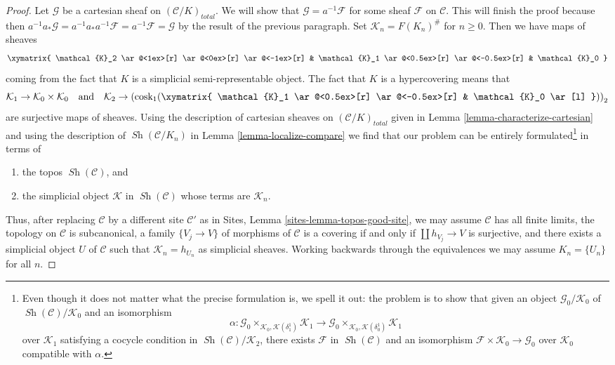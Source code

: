 \documentclass[10pt,a4paper]{amsart}
\theoremstyle{plain}
\theoremstyle{definition}
\theoremstyle{remark}
\numberwithin{equation}{subsection}
\def\Sh{\mathop{\mathit{Sh}}\nolimits}
\begin{document}
\begin{proof}
\medskip\noindent
Let $\mathcal{G}$ be a cartesian sheaf on $(\mathcal{C}/K)_{total}$.
We will show that $\mathcal{G} = a^{-1}\mathcal{F}$ for some sheaf
$\mathcal{F}$ on $\mathcal{C}$. This will finish the proof because
then $a^{-1}a_*\mathcal{G} = a^{-1}a_*a^{-1}\mathcal{F} =
a^{-1}\mathcal{F} = \mathcal{G}$ by the result of the previous paragraph.
Set $\mathcal{K}_n = F(K_n)^\#$ for $n \geq 0$. Then we have maps of sheaves
$$
\xymatrix{
\mathcal{K}_2
\ar@<1ex>[r]
\ar@<0ex>[r]
\ar@<-1ex>[r]
&
\mathcal{K}_1
\ar@<0.5ex>[r]
\ar@<-0.5ex>[r]
&
\mathcal{K}_0
}
$$
coming from the fact that $K$ is a simplicial semi-representable object.
The fact that $K$ is a hypercovering means that
$$
\mathcal{K}_1 \to \mathcal{K}_0 \times \mathcal{K}_0
\quad\text{and}\quad
\mathcal{K}_2 \to
\left(\text{cosk}_1(
\xymatrix{
\mathcal{K}_1
\ar@<0.5ex>[r]
\ar@<-0.5ex>[r]
&
\mathcal{K}_0 \ar[l]
})\right)_2
$$
are surjective maps of sheaves. Using the description of cartesian sheaves on
$(\mathcal{C}/K)_{total}$ given in Lemma \ref{lemma-characterize-cartesian}
and using the description of $\Sh(\mathcal{C}/K_n)$ in
Lemma \ref{lemma-localize-compare}
we find that our problem can be entirely formulated\footnote{Even though it
does not matter what the precise formulation is, we spell it out:
the problem is to show that given an object
$\mathcal{G}_0/\mathcal{K}_0$ of $\Sh(\mathcal{C})/\mathcal{K}_0$
and an isomorphism
$$
\alpha :
\mathcal{G}_0 \times_{\mathcal{K}_0, \mathcal{K}(\delta^1_1)} \mathcal{K}_1 \to
\mathcal{G}_0 \times_{\mathcal{K}_0, \mathcal{K}(\delta^1_0)} \mathcal{K}_1
$$
over $\mathcal{K}_1$ satisfying a cocycle condition in
$\Sh(\mathcal{C})/\mathcal{K}_2$, there exists
$\mathcal{F}$ in $\Sh(\mathcal{C})$ and an isomorphism
$\mathcal{F} \times \mathcal{K}_0 \to \mathcal{G}_0$ over $\mathcal{K}_0$
compatible with $\alpha$.} in terms of
\begin{enumerate}
\item the topos $\Sh(\mathcal{C})$, and
\item the simplicial object $\mathcal{K}$ in $\Sh(\mathcal{C})$
whose terms are $\mathcal{K}_n$.
\end{enumerate}
Thus, after replacing $\mathcal{C}$ by a different site $\mathcal{C}'$
as in Sites, Lemma \ref{sites-lemma-topos-good-site}, we may assume
$\mathcal{C}$ has all finite limits,
the topology on $\mathcal{C}$ is subcanonical,
a family $\{V_j \to V\}$ of morphisms of $\mathcal{C}$
is a covering if and only if $\coprod h_{V_j} \to V$ is surjective, and
there exists a simplicial object $U$ of $\mathcal{C}$
such that $\mathcal{K}_n = h_{U_n}$ as simplicial sheaves.
Working backwards through the equivalences we may assume
$K_n = \{U_n\}$ for all $n$.


\end{proof}
\end{document}
